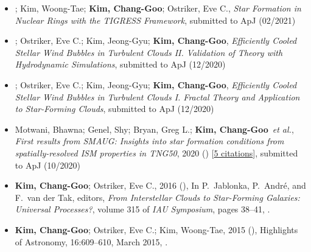 \documentclass[12pt,preprint,letter]{aastex63}
\begin{document}
\begin{itemize}
\begin{itemize}[itemsep=1pt]
\item {}; Kim, Woong-Tae; \textbf{Kim, Chang-Goo}; Ostriker, Eve C., \textit{Star Formation in Nuclear Rings with the TIGRESS Framework}, submitted to ApJ (02/2021)

\item {}; Ostriker, Eve C.; Kim, Jeong-Gyu; \textbf{Kim, Chang-Goo}, \textit{Efficiently Cooled Stellar Wind Bubbles in Turbulent Clouds II. Validation of Theory with Hydrodynamic Simulations}, submitted to ApJ (12/2020)

\item {}; Ostriker, Eve C.; Kim, Jeong-Gyu; \textbf{Kim, Chang-Goo}, \textit{Efficiently Cooled Stellar Wind Bubbles in Turbulent Clouds I. Fractal Theory and Application to Star-Forming Clouds}, submitted to ApJ (12/2020)

\item Motwani, Bhawna; Genel, Shy; Bryan, Greg L.; \textbf{Kim, Chang-Goo}~\textit{et al.}, \textit{First results from SMAUG: Insights into star formation conditions from spatially-resolved ISM properties in TNG50}, 2020 () [\href{http://adsabs.harvard.edu/abs/2020arXiv200616314M}{5 citations}], submitted to ApJ (10/2020)

\end{itemize}

\begin{itemize}[itemsep=1pt]
\item \textbf{Kim, Chang-Goo}; Ostriker, Eve C., 2016 (), In P.~{Jablonka},
  P.~{Andr{\'e}}, and F.~{van der Tak}, editors, {\em From Interstellar Clouds
  to Star-Forming Galaxies: Universal Processes?}, volume 315 of {\em IAU
  Symposium}, pages 38--41, .
\item \textbf{Kim, Chang-Goo}; Ostriker, Eve C.; Kim, Woong-Tae, 2015 (),
  Highlights of Astronomy, 16:609--610, March 2015, .
\end{itemize}


\end{itemize}
\end{document}
